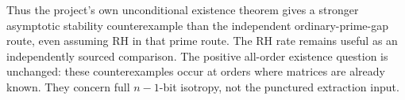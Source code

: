 Thus the project's own unconditional existence theorem gives a
stronger asymptotic stability counterexample than the independent
ordinary-prime-gap route, even assuming RH in that prime route.
The RH rate remains useful as an independently sourced comparison.
The positive all-order existence question is unchanged: these
counterexamples occur at orders where matrices are already known.
They concern full $n-1$-bit isotropy, not the punctured extraction input.
